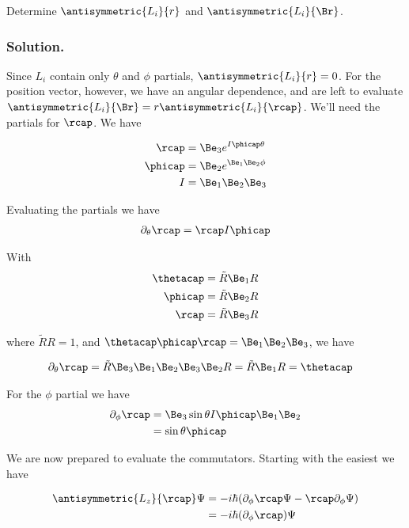 Determine $\antisymmetric{L_i}{r}$ and $\antisymmetric{L_i}{\Br}$.

\subsubsection{Solution.}

Since $L_i$ contain only $\theta$ and $\phi$ partials, $\antisymmetric{L_i}{r} = 0$.  For the position vector, however, we have an angular dependence, and are left to evaluate $\antisymmetric{L_i}{\Br} = r \antisymmetric{L_i}{\rcap}$.  We'll need the partials for $\rcap$.  We have

\begin{align}\label{eqn:desaiCh4:600}
\rcap &= \Be_3 e^{I \phicap \theta} \\
\phicap &= \Be_2 e^{\Be_1 \Be_2 \phi} \\
I &= \Be_1 \Be_2 \Be_3
\end{align}

Evaluating the partials we have
\begin{align*}
\partial_\theta \rcap = \rcap I \phicap
\end{align*}

With
\begin{align}\label{eqn:desaiCh4:602}
\thetacap &= \tilde{R} \Be_1 R \\
\phicap &= \tilde{R} \Be_2 R \\
\rcap &= \tilde{R} \Be_3 R
\end{align}

where $\tilde{R} R = 1$, and $\thetacap \phicap \rcap = \Be_1 \Be_2 \Be_3$, we have

\begin{align}\label{eqn:desaiCh4:601}
\partial_\theta \rcap &= \tilde{R} \Be_3 \Be_1 \Be_2 \Be_3 \Be_2 R = \tilde{R} \Be_1 R = \thetacap
\end{align}

For the $\phi$ partial we have
\begin{align*}
\partial_\phi \rcap
&= \Be_3 \sin\theta I \phicap \Be_1 \Be_2 \\
&= \sin\theta \phicap
\end{align*}

We are now prepared to evaluate the commutators.  Starting with the easiest we have

\begin{align*}
\antisymmetric{L_z}{\rcap} \Psi
&=
-i \hbar (\partial_\phi \rcap \Psi - \rcap \partial_\phi \Psi ) \\
&=
-i \hbar (\partial_\phi \rcap) \Psi  \\
\end{align*}

